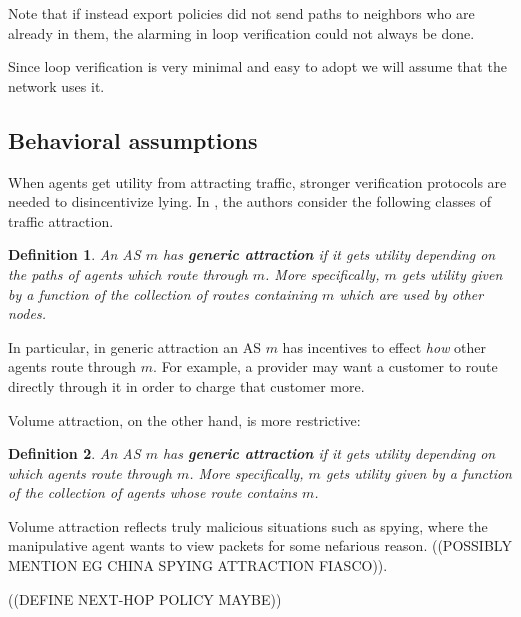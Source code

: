 \documentclass[10pt]{article}
\newtheorem{definition}{Definition}
\begin{document}
    Note that if instead export policies did not send paths to neighbors who are
    already in them, the alarming in loop verification could not always be done.

    Since loop verification is very minimal and easy to adopt we will assume that
    the network uses it.

  \subsection{Behavioral assumptions}
    When agents get utility from attracting traffic, stronger verification
    protocols are needed to disincentivize lying.
    In \cite{Attraction}, the authors consider the following classes of
    traffic attraction.

    \begin{definition}
      An AS $m$ has \textbf{generic attraction} if it gets utility depending on
      the paths of agents which route through $m$.
      More specifically, $m$ gets utility given by a function of the
      collection of routes containing $m$ which are used by other nodes.
    \end{definition}
    In particular, in generic attraction an AS $m$ has incentives to effect
    \emph{how} other agents route through $m$.
    For example, a provider may want a customer to route directly through it
    in order to charge that customer more.

    Volume attraction, on the other hand, is more restrictive:
    \begin{definition}
      An AS $m$ has \textbf{generic attraction} if it gets utility depending on
      which agents route through $m$.
      More specifically, $m$ gets utility given by a function of the
      collection of agents whose route contains $m$.
    \end{definition}
    Volume attraction reflects truly malicious situations such as spying,
    where the manipulative agent wants to view packets for some nefarious
    reason. ((POSSIBLY MENTION EG CHINA SPYING ATTRACTION FIASCO)).

    ((DEFINE NEXT-HOP POLICY MAYBE))
\end{document}
